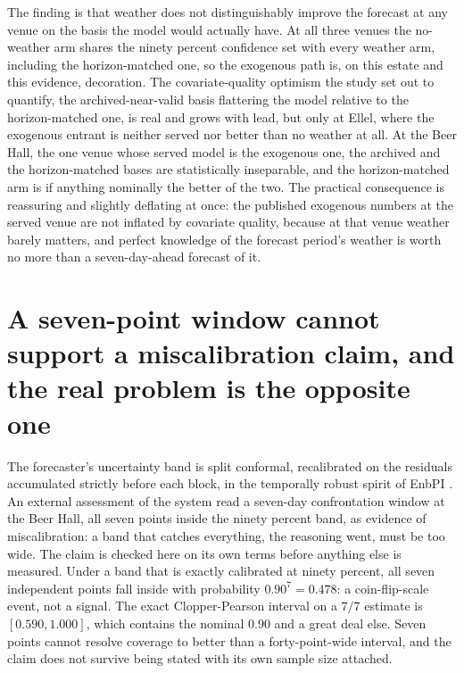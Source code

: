 The finding is that weather does not distinguishably improve the forecast at any venue on the
basis the model would actually have. At all three venues the no-weather arm shares the ninety
percent confidence set with every weather arm, including the horizon-matched one, so the
exogenous path is, on this estate and this evidence, decoration. The covariate-quality optimism
the study set out to quantify, the archived-near-valid basis flattering the model relative to
the horizon-matched one, is real and grows with lead, but only at Ellel, where the exogenous
entrant is neither served nor better than no weather at all. At the Beer Hall, the one venue
whose served model is the exogenous one, the archived and the horizon-matched bases are
statistically inseparable, and the horizon-matched arm is if anything nominally the better of
the two. The practical consequence is reassuring and slightly deflating at once: the published
exogenous numbers at the served venue are not inflated by covariate quality, because at that
venue weather barely matters, and perfect knowledge of the forecast period's weather is worth no
more than a seven-day-ahead forecast of it.

\section{A seven-point window cannot support a miscalibration claim, and the real problem is the
opposite one}
\label{sec:interval-calibration}

The forecaster's uncertainty band is split conformal, recalibrated on the residuals accumulated
strictly before each block, in the temporally robust spirit of EnbPI \citep{xu_conformal_2021}.
An external assessment of the system read a seven-day confrontation window at the Beer Hall, all
seven points inside the ninety percent band, as evidence of miscalibration: a band that catches
everything, the reasoning went, must be too wide. The claim is checked here on its own terms
before anything else is measured. Under a band that is exactly calibrated at ninety percent, all
seven independent points fall inside with probability $0.90^7 = 0.478$: a coin-flip-scale event,
not a signal. The exact Clopper-Pearson interval on a $7/7$ estimate is $[0.590, 1.000]$, which
contains the nominal $0.90$ and a great deal else. Seven points cannot resolve coverage to better
than a forty-point-wide interval, and the claim does not survive being stated with its own
sample size attached.

